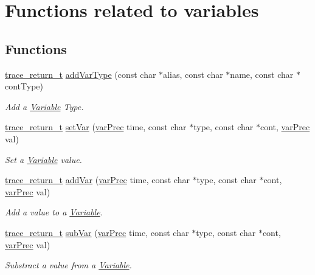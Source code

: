 \hypertarget{group__varf}{\section{Functions related to variables}
\label{group__varf}
}
\subsection*{Functions}
\begin{DoxyCompactItemize}
\item 
\hyperlink{group__type_ga1f1b68fb37d7331f03a48ef0993a0788}{trace\-\_\-return\-\_\-t} \hyperlink{group__varf_ga7c621d853b9d0058a065db58cdb94ec8}{add\-Var\-Type} (const char $\ast$alias, const char $\ast$name, const char $\ast$cont\-Type)
\begin{DoxyCompactList}\small\item\em Add a \hyperlink{structVariable}{Variable} Type. \end{DoxyCompactList}\item 
\hyperlink{group__type_ga1f1b68fb37d7331f03a48ef0993a0788}{trace\-\_\-return\-\_\-t} \hyperlink{group__varf_gac897f3ccddc88ce6bd46ca6594cc5605}{set\-Var} (\hyperlink{group__type_gabda13d5bcd0cbdb094d655181a857e25}{var\-Prec} time, const char $\ast$type, const char $\ast$cont, \hyperlink{group__type_gabda13d5bcd0cbdb094d655181a857e25}{var\-Prec} val)
\begin{DoxyCompactList}\small\item\em Set a \hyperlink{structVariable}{Variable} value. \end{DoxyCompactList}\item 
\hyperlink{group__type_ga1f1b68fb37d7331f03a48ef0993a0788}{trace\-\_\-return\-\_\-t} \hyperlink{group__varf_ga305787a5e14f17a2a0961be702c4ff25}{add\-Var} (\hyperlink{group__type_gabda13d5bcd0cbdb094d655181a857e25}{var\-Prec} time, const char $\ast$type, const char $\ast$cont, \hyperlink{group__type_gabda13d5bcd0cbdb094d655181a857e25}{var\-Prec} val)
\begin{DoxyCompactList}\small\item\em Add a value to a \hyperlink{structVariable}{Variable}. \end{DoxyCompactList}\item 
\hyperlink{group__type_ga1f1b68fb37d7331f03a48ef0993a0788}{trace\-\_\-return\-\_\-t} \hyperlink{group__varf_ga573290384c5fe8b600fc999473117067}{sub\-Var} (\hyperlink{group__type_gabda13d5bcd0cbdb094d655181a857e25}{var\-Prec} time, const char $\ast$type, const char $\ast$cont, \hyperlink{group__type_gabda13d5bcd0cbdb094d655181a857e25}{var\-Prec} val)
\begin{DoxyCompactList}\small\item\em Substract a value from a \hyperlink{structVariable}{Variable}. \end{DoxyCompactList}\end{DoxyCompactItemize}


